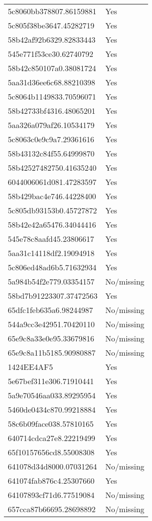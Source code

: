 \begin{tabular}{ll}
5c8060bb378807.86159881 & Yes \\
5c805f38be3647.45282719 & Yes \\
58b42af92b6329.82833443 & Yes \\
545e771f53ce30.62740792 & Yes \\
58b42c850107a0.38081724 & Yes \\
5aa31d36ee6c68.88210398 & Yes \\
5c8064b1149833.70596071 & Yes \\
58b42733bf4316.48065201 & Yes \\
5aa326a079af26.10534179 & Yes \\
5c8063c0e9c9a7.29361616 & Yes \\
58b43132c84f55.64999870 & Yes \\
58b42527482750.41635240 & Yes \\
6044006061d081.47283597 & Yes \\
58b429bac4e746.44228400 & Yes \\
5c805db93153b0.45727872 & Yes \\
58b42e42a65476.34044416 & Yes \\
545e78c8aafd45.23806617 & Yes \\
5aa31c14118df2.19094918 & Yes \\
5c806ed48ad6b5.71632934 & Yes \\
5a984b54f2e779.03354157 & No/missing \\
58bd7b91223307.37472563 & Yes \\
65dfc1feb635a6.98244987 & No/missing \\
544a9cc3e42951.70420110 & No/missing \\
65e9c8a33e0e95.33679816 & No/missing \\
65e9c8a11b5185.90980887 & No/missing \\
1424EE4AF5 & Yes \\
5e67bef311e306.71910441 & Yes \\
5a9e70546aa033.89295954 & Yes \\
5460de0434c870.99218884 & Yes \\
58c6b09face038.57810165 & Yes \\
640714cdca27e8.22219499 & Yes \\
65f10157656cd8.55008308 & Yes \\
641078d34d8000.07031264 & No/missing \\
641074fab876c4.25307660 & Yes \\
64107893cf71d6.77519084 & No/missing \\
657cca87b66695.28698892 & No/missing \\

\end{tabular}

